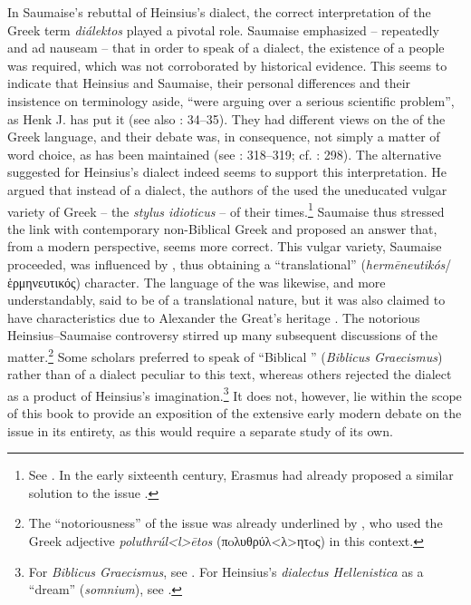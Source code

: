 In Saumaise’s rebuttal of Heinsius’s  dialect, the correct interpretation of the Greek term \textit{diálektos} played a pivotal role. Saumaise emphasized – repeatedly and ad nauseam – that in order to speak of a  dialect, the existence of a  people was required, which was not corroborated by historical evidence. This seems to indicate that Heinsius and Saumaise, their personal differences and their insistence on terminology aside, “were arguing over a serious scientific problem”, as Henk J. \citet[117]{De1981} has put it (see also \citealt{De1980}: 34–35). They had different views on the  of the Greek language, and their debate was, in consequence, not simply a matter of word choice, as has been maintained (see \citealt{Simon1689}: 318--319; cf. \citealt{Considine2012}: 298). The alternative \citet[98–99, 240–266]{Saumaise1643a} suggested for Heinsius’s  dialect indeed seems to support this interpretation. He argued that instead of a  dialect, the authors of the  used the uneducated vulgar variety of  Greek – the \textit{stylus idioticus} – of their times.\footnote{See \citet[34--35]{De1980}. In the early sixteenth century, Erasmus had already proposed a similar solution to the issue \citep[181]{Bentley1983}.} Saumaise thus stressed the link with contemporary non-Biblical Greek and proposed an answer that, from a modern perspective, seems more correct. This vulgar variety, Saumaise proceeded, was influenced by , thus obtaining a “translational” (\textit{hermēneutikós}/ἑρμηνευτικός) character. The language of the  was likewise, and more understandably, said to be of a translational nature, but it was also claimed to have  characteristics due to Alexander the Great’s heritage \citep[264]{Saumaise1643a}. The notorious Heinsius–Saumaise controversy stirred up many subsequent discussions of the matter.\footnote{The “notoriousness” of the issue was already underlined by \citet[\textsc{ii.}74]{Morhof1708}, who used the Greek adjective \textit{poluthrúl<l>ētos}  (πoλυθρύλ<λ>ητoς) in this context.} Some scholars preferred to speak of “Biblical ” (\textit{Biblicus Graecismus}) rather than of a dialect peculiar to this text, whereas others rejected the  dialect as a product of Heinsius’s imagination.\footnote{For \textit{Biblicus Graecismus}, see \citet[\textsc{b.3}\textsc{\textsuperscript{v}}]{Bolius1689}. For Heinsius’s \textit{dialectus Hellenistica} as a “dream” (\textit{somnium}), see \citet{De1644}.} It does not, however, lie within the scope of this book to provide an exposition of the extensive early modern debate on the issue in its entirety, as this would require a separate study of its own.

